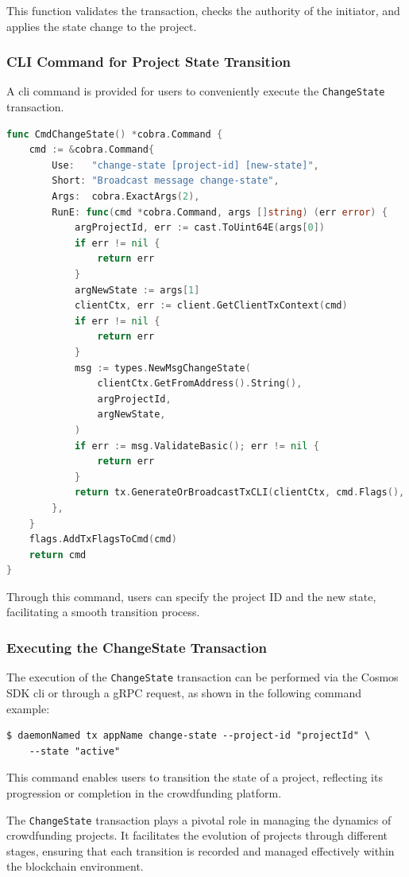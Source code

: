 This function validates the transaction, checks the authority of the initiator, and applies the state change to the project.

\subsubsection{CLI Command for Project State Transition}

A \gls{cli} command is provided for users to conveniently execute the \texttt{ChangeState} transaction.

\begin{lstlisting}[language=go, caption=Change State CLI Definition, label={lst:change-state-cli}]
func CmdChangeState() *cobra.Command {
	cmd := &cobra.Command{
		Use:   "change-state [project-id] [new-state]",
		Short: "Broadcast message change-state",
		Args:  cobra.ExactArgs(2),
		RunE: func(cmd *cobra.Command, args []string) (err error) {
			argProjectId, err := cast.ToUint64E(args[0])
			if err != nil {
				return err
			}
			argNewState := args[1]
			clientCtx, err := client.GetClientTxContext(cmd)
			if err != nil {
				return err
			}
			msg := types.NewMsgChangeState(
				clientCtx.GetFromAddress().String(),
				argProjectId,
				argNewState,
			)
			if err := msg.ValidateBasic(); err != nil {
				return err
			}
			return tx.GenerateOrBroadcastTxCLI(clientCtx, cmd.Flags(), msg)
		},
	}
	flags.AddTxFlagsToCmd(cmd)
	return cmd
}
\end{lstlisting}

Through this command, users can specify the project ID and the new state, facilitating a smooth transition process.

\subsubsection{Executing the ChangeState Transaction}

The execution of the \texttt{ChangeState} transaction can be performed via the Cosmos SDK \gls{cli} or through a gRPC request, as shown in the following command example:

\begin{verbatim}
$ daemonNamed tx appName change-state --project-id "projectId" \
    --state "active"
\end{verbatim}

This command enables users to transition the state of a project, reflecting its progression or completion in the crowdfunding platform.

The \texttt{ChangeState} transaction plays a pivotal role in managing the dynamics of crowdfunding projects. It facilitates the evolution of projects through different stages, ensuring that each transition is recorded and managed effectively within the blockchain environment.


